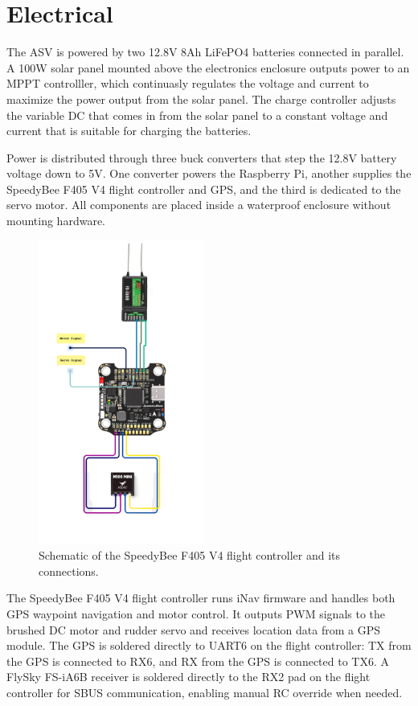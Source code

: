 \section{Electrical}

The ASV is powered by two 12.8V 8Ah LiFePO4 batteries connected in parallel. A 100W solar panel mounted above the electronics enclosure outputs power to an MPPT controlller, which continuasly regulates the voltage and current to maximize the power output from the solar panel. The charge controller adjusts the variable DC that comes in from the solar panel to a constant voltage and current that is suitable for charging the batteries. 

Power is distributed through three buck converters that step the 12.8V battery voltage down to 5V. One converter powers the Raspberry Pi, another supplies the SpeedyBee F405 V4 flight controller and GPS, and the third is dedicated to the servo motor. All components are placed inside a waterproof enclosure without mounting hardware.

\begin{figure}[H]
    \centering
    \includegraphics[height=10cm]{speedybee.png}
    \caption{Schematic of the SpeedyBee F405 V4 flight controller and its connections.}
    \label{fig:Speedybee}
\end{figure}

The SpeedyBee F405 V4 flight controller runs iNav firmware and handles both GPS waypoint navigation and motor control. It outputs PWM signals to the brushed DC motor and rudder servo and receives location data from a GPS module. The GPS is soldered directly to UART6 on the flight controller: TX from the GPS is connected to RX6, and RX from the GPS is connected to TX6. A FlySky FS-iA6B receiver is soldered directly to the RX2 pad on the flight controller for SBUS communication, enabling manual RC override when needed.


